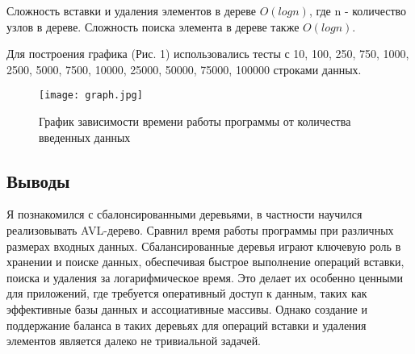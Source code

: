 \documentclass[12pt]{article}
\begin{document}
Сложность вставки и удаления элементов в дереве $O(log n)$, где n - количество узлов в дереве.
Сложность поиска элемента в дереве также $O(log n)$.

Для построения графика (Рис. 1) использовались тесты с 10, 100, 250, 750, 1000, 2500, 5000, 7500, 10000, 25000, 50000, 75000, 100000 строками данных.

\begin{figure}
    \centering
    \texttt{[image: graph.jpg]}
    \caption{График зависимости времени работы программы от количества введенных данных}
\end{figure}

\newpage
\subsection*{Выводы}
Я познакомился с сбалонсированными деревьями, в частности научился реализовывать
AVL-дерево. Сравнил время работы программы при различных размерах входных данных.
Сбалансированные деревья играют ключевую роль в хранении и поиске данных, обеспечивая быстрое выполнение операций вставки, поиска и удаления за логарифмическое время.
Это делает их особенно ценными для приложений, где требуется оперативный доступ к данным, таких как эффективные базы данных и ассоциативные массивы.
Однако создание и поддержание баланса в таких деревьях для операций вставки и удаления элементов является далеко не тривиальной задачей.
\end{document}

